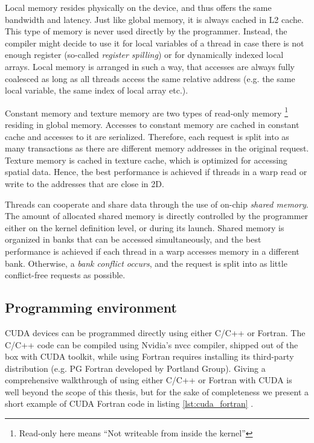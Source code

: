 Local memory resides physically on the device, and thus offers the same bandwidth and latency. Just like global memory, it is always cached in L2 cache. This type of memory is never used directly by the programmer. Instead, the compiler might decide to use it for local variables of a thread in case there is not enough register (so-called \emph{register spilling}) or for dynamically indexed local arrays. Local memory is arranged in such a way, that accesses are always fully coalesced as long as all threads access the same relative address (e.g. the same local variable, the same index of local array etc.).

Constant memory and texture memory are two types of read-only memory \footnote{Read-only here means ``Not writeable from inside the kernel''} residing in global memory. Accesses to constant memory are cached in constant cache and accesses to it are serialized. Therefore, each request is split into as many  transactions as there are different memory addresses in the original request. Texture memory is cached in texture cache, which is optimized for accessing spatial data. Hence, the best performance is achieved if threads in a warp read or write to the addresses that are close in 2D.

Threads can cooperate and share data through the use of on-chip \emph{shared  memory}. The amount of allocated shared memory is directly controlled by the programmer either on the kernel definition level, or during its launch. Shared memory is organized in banks that can be accessed simultaneously, and the best performance is achieved if each thread in a warp accesses memory in a different bank. Otherwise, a \emph{bank conflict occurs}, and the request is split into as little conflict-free requests as possible.


\subsection{Programming environment}
CUDA devices can be programmed directly using either C/C++ or Fortran. The C/C++ code can be compiled using Nvidia's nvcc compiler, shipped out of the box with CUDA toolkit, while using Fortran requires installing its third-party distribution (e.g. PG Fortran developed by Portland Group). Giving a comprehensive walkthrough of using either C/C++ or Fortran with CUDA is well beyond the scope of this thesis, but for the sake of completeness we present a short example of CUDA Fortran code in listing \ref{lst:cuda_fortran} .

